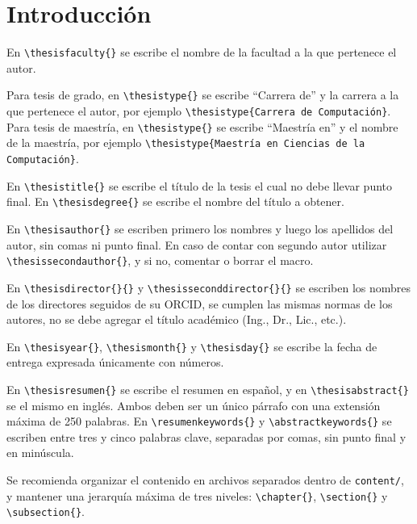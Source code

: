 \chapter{Introducción}
En \verb|\thesisfaculty{}| se escribe el nombre de la facultad a la que pertenece el
autor.

Para tesis de grado, en \verb|\thesistype{}| se escribe ``Carrera de'' y la carrera a la
que pertenece el autor, por ejemplo \verb|\thesistype{Carrera de Computación}|. Para
tesis de maestría, en \verb|\thesistype{}| se escribe ``Maestría en'' y el nombre de la
maestría, por ejemplo \verb|\thesistype{Maestría en Ciencias de la Computación}|.

En \verb|\thesistitle{}| se escribe el título de la tesis el cual no debe llevar punto
final. En \verb|\thesisdegree{}| se escribe el nombre del título a obtener.

En \verb|\thesisauthor{}| se escriben primero los nombres y luego los apellidos del
autor, sin comas ni punto final. En caso de contar con segundo autor utilizar
\verb|\thesissecondauthor{}|, y si no, comentar o borrar el macro.

En \verb|\thesisdirector{}{}| y \verb|\thesisseconddirector{}{}| se escriben los nombres
de los directores seguidos de su ORCID, se cumplen las mismas normas de los autores, no
se debe agregar el título académico (Ing., Dr., Lic., etc.).

En \verb|\thesisyear{}|, \verb|\thesismonth{}| y \verb|\thesisday{}| se escribe la fecha
de entrega expresada únicamente con números.

En \verb|\thesisresumen{}| se escribe el resumen en español, y en
\verb|\thesisabstract{}| se el mismo en inglés. Ambos deben ser un único párrafo con una
extensión máxima de 250 palabras. En \verb|\resumenkeywords{}| y
\verb|\abstractkeywords{}| se escriben entre tres y cinco palabras clave, separadas por
comas, sin punto final y en minúscula.

Se recomienda organizar el contenido en archivos separados dentro de \verb|content/|, y
mantener una jerarquía máxima de tres niveles: \verb|\chapter{}|, \verb|\section{}| y
\verb|\subsection{}|.

